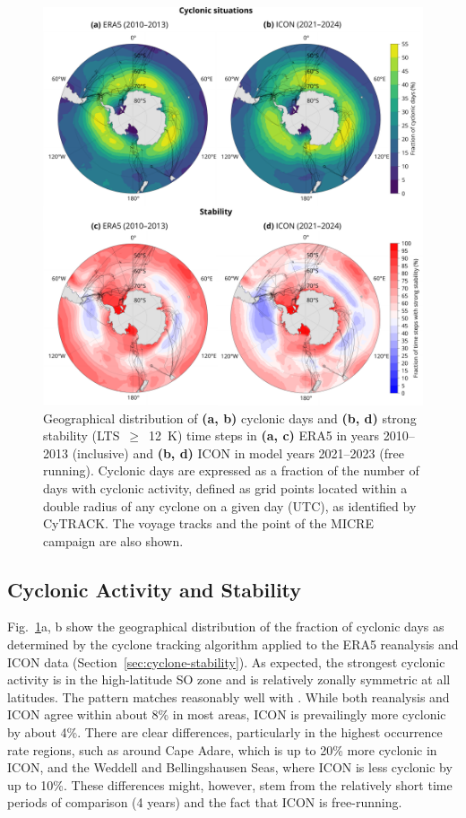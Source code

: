 \documentclass[draft]{agujournal2019}
\begin{document}
\begin{figure}[p!]
\centering
\includegraphics[width=\textwidth]{img/cyc_stab_dist_rev1.pdf}
\caption{
Geographical distribution of \textbf{(a, b)} cyclonic days and \textbf{(b, d)} strong stability (LTS~$\geq$~12~K) time steps in \textbf{(a, c)} ERA5 in years 2010--2013 (inclusive) and \textbf{(b, d)} ICON in model years 2021--2023 (free running). Cyclonic days are expressed as a fraction of the number of days with cyclonic activity, defined as grid points located within a double radius of any cyclone on a given day (UTC), as identified by CyTRACK. The voyage tracks and the point of the MICRE campaign are also shown.
}
\label{fig:cyclone-stability}
\end{figure}

\subsection{Cyclonic Activity and Stability}

Fig.~\ref{fig:cyclone-stability}a, b show the geographical distribution of the fraction of cyclonic days as determined by the cyclone tracking algorithm applied to the ERA5 reanalysis and ICON data (Section~\ref{sec:cyclone-stability}). As expected, the strongest cyclonic activity is in the high-latitude SO zone and is relatively zonally symmetric at all latitudes. The pattern matches reasonably well with . While both reanalysis and ICON agree within about 8\% in most areas, ICON is prevailingly more cyclonic by about 4\%. There are clear differences, particularly in the highest occurrence rate regions, such as around Cape Adare, which is up to 20\% more cyclonic in ICON, and the Weddell and Bellingshausen Seas, where ICON is less cyclonic by up to 10\%. These differences might, however, stem from the relatively short time periods of comparison (4 years) and the fact that ICON is free-running.
\end{document}
